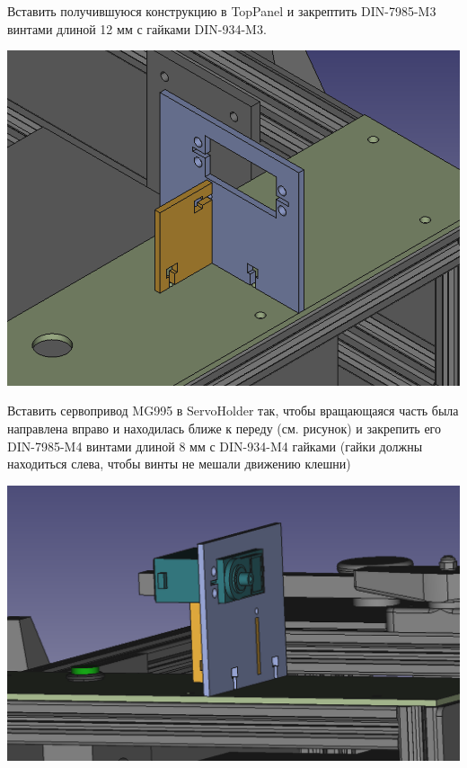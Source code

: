 \documentclass[12pt,a4paper,oneside]{article}
\begin{document}
Вставить получившуюся конструкцию в TopPanel и закрептить DIN-7985-M3 винтами
длиной 12 мм с гайками DIN-934-M3.

\includegraphics[width=\textwidth]{servoholder-toppanel}

Вставить сервопривод MG995 в ServoHolder так, чтобы вращающаяся часть была
направлена вправо и находилась ближе к переду (см. рисунок) и закрепить его
DIN-7985-M4 винтами длиной 8 мм с DIN-934-M4 гайками (гайки должны находиться слева, чтобы
винты не мешали движению клешни)

\includegraphics[width=\textwidth]{installedservo}
\end{document}
